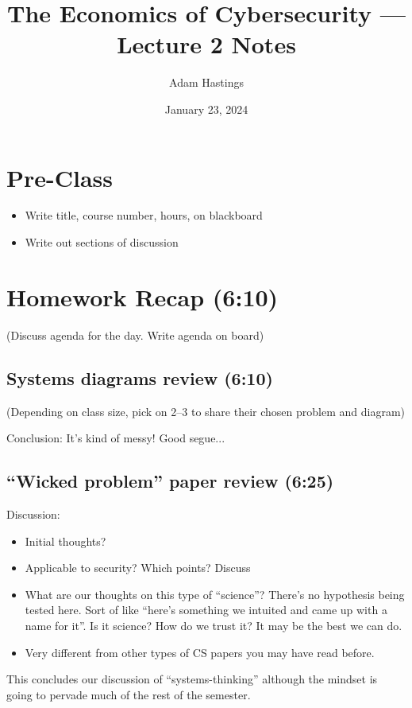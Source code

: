 \documentclass[11pt]{article}
\title{The Economics of Cybersecurity --- Lecture 2 Notes}
\date{January 23, 2024}
\author{Adam Hastings}
\begin{document}
\maketitle

\section*{Pre-Class}
\begin{itemize}
    \item Write title, course number, hours, on blackboard
    \item Write out sections of discussion
\end{itemize}

\section{Homework Recap (6:10)} 

(Discuss agenda for the day. Write agenda on board)

\subsection{Systems diagrams review (6:10)}

(Depending on class size, pick on 2--3 to share their chosen problem and diagram)

Conclusion: It's kind of messy! Good segue...

\subsection{``Wicked problem'' paper review (6:25)}

Discussion:
\begin{itemize}
    \item Initial thoughts?
    \item Applicable to security? Which points? Discuss
    \item What are our thoughts on this type of ``science''? There's no hypothesis being tested here. Sort of like ``here's something we intuited and came up with a name for it''. Is it science? How do we trust it? It may be the best we can do. 
    \item Very different from other types of CS papers you may have read before.
\end{itemize}

This concludes our discussion of ``systems-thinking'' although the mindset is going to pervade much of the rest of the semester.
\end{document}
